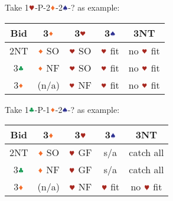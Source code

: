 \documentclass{article}
\newcommand*{\ccc}{\textcolor{ForestGreen}{\clubsuit}}
\newcommand*{\ddd}{\textcolor{Orange}{\vardiamondsuit}}
\newcommand*{\hhh}{\textcolor{Mahogany}{\varheartsuit}}
\newcommand*{\sss}{\textcolor{Blue}{\spadesuit}}
\begin{document}
\begin{multicols}{2}
\noindent Take 1$\hhh$-P-2$\ddd$-2$\sss$-? as example: \\
\begin{tabular}{c|c|c|c|c}
    \hline
    Bid & 3$\ddd$ & 3$\hhh$ & 3$\sss$ & 3NT \\ \hline\hline
    2NT & $\ddd$ SO & $\hhh$ SO & $\hhh$ fit & no $\hhh$ fit \\ \hline
    3$\ccc$ & $\ddd$ NF & $\hhh$ SO & $\hhh$ fit & no $\hhh$ fit \\ \hline
    3$\ddd$ & (n/a) & $\hhh$ NF & $\hhh$ fit & no $\hhh$ fit \\ \hline
\end{tabular}

\noindent Take 1$\ccc$-P-1$\ddd$-2$\sss$-? as example: \\
\begin{tabular}{c|c|c|c|c}
    \hline
    Bid & 3$\ddd$ & 3$\hhh$ & 3$\sss$ & 3NT \\ \hline\hline
    2NT & $\ddd$ SO & $\hhh$ GF & s/a & catch all \\ \hline
    3$\ccc$ & $\ddd$ NF & $\hhh$ GF & s/a & catch all \\ \hline
    3$\ddd$ & (n/a) & $\hhh$ NF & $\hhh$ fit & no $\hhh$ fit \\ \hline
\end{tabular}


\end{multicols}
\end{document}
